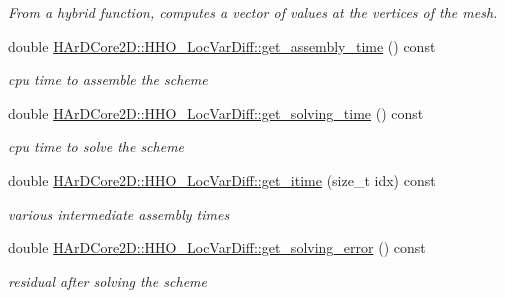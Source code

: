 \begin{DoxyCompactItemize}
\begin{DoxyCompactList}\small\item\em From a hybrid function, computes a vector of values at the vertices of the mesh. \end{DoxyCompactList}\item 
\mbox{\label{group__HHO__LocVarDiff_ga9c37d2cf2744465d0bf50ff02fe185f9}} 
double \hyperlink{group__HHO__LocVarDiff_ga9c37d2cf2744465d0bf50ff02fe185f9}{H\+Ar\+D\+Core2\+D\+::\+H\+H\+O\+\_\+\+Loc\+Var\+Diff\+::get\+\_\+assembly\+\_\+time} () const
\begin{DoxyCompactList}\small\item\em cpu time to assemble the scheme \end{DoxyCompactList}\item 
\mbox{\label{group__HHO__LocVarDiff_gad184ecd99c5da4172395a210d0289c12}} 
double \hyperlink{group__HHO__LocVarDiff_gad184ecd99c5da4172395a210d0289c12}{H\+Ar\+D\+Core2\+D\+::\+H\+H\+O\+\_\+\+Loc\+Var\+Diff\+::get\+\_\+solving\+\_\+time} () const
\begin{DoxyCompactList}\small\item\em cpu time to solve the scheme \end{DoxyCompactList}\item 
\mbox{\label{group__HHO__LocVarDiff_ga61e65ce589db4203515ae8e1f5c30d0f}} 
double \hyperlink{group__HHO__LocVarDiff_ga61e65ce589db4203515ae8e1f5c30d0f}{H\+Ar\+D\+Core2\+D\+::\+H\+H\+O\+\_\+\+Loc\+Var\+Diff\+::get\+\_\+itime} (size\+\_\+t idx) const
\begin{DoxyCompactList}\small\item\em various intermediate assembly times \end{DoxyCompactList}\item 
\mbox{\label{group__HHO__LocVarDiff_ga9648b003ca1d519794bcc5407c8ce606}} 
double \hyperlink{group__HHO__LocVarDiff_ga9648b003ca1d519794bcc5407c8ce606}{H\+Ar\+D\+Core2\+D\+::\+H\+H\+O\+\_\+\+Loc\+Var\+Diff\+::get\+\_\+solving\+\_\+error} () const
\begin{DoxyCompactList}\small\item\em residual after solving the scheme \end{DoxyCompactList}\end{DoxyCompactItemize}


